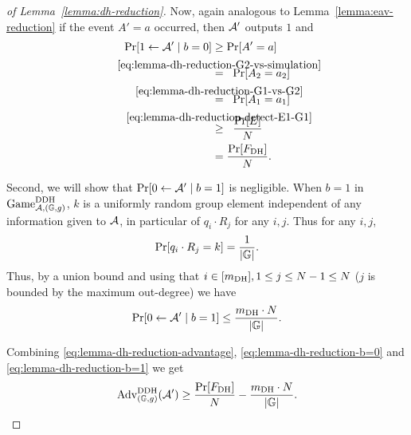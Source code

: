 \begin{proof}[of Lemma~\ref{lemma:dh-reduction}]
	Now, again analogous to Lemma~\ref{lemma:eav-reduction} if the event $A' = a$ occurred, then $\mathcal{A}'$ outputs $1$ and
	\begin{align*}
		\pr{1 \from \adv' \mid b = 0} & \ge \pr{A' = a}                                                             \\
		                            & \stackrel{\mathclap{\eqref{eq:lemma-dh-reduction-G2-vs-simulation}}}{=} \;\; \pr{A_2 = a_2} \\
		                            & \stackrel{\mathclap{\eqref{eq:lemma-dh-reduction-G1-vs-G2}}}{=} \;\; \pr{A_1 = a_1}        \\
		                            & \stackrel{\mathclap{\eqref{eq:lemma-dh-reduction-detect-E1-G1}}}{\ge} \;\; \frac{\pr{E}}{N} \\
		                            & = \frac{\pr{\fdh}}{N}.
	\end{align*}

	Second, we will show that $\pr{0 \from \adv' \mid b = 1}$ is negligible. When $b = 1$ in $\mathrm{Game}_{\mathcal{A}, (\mathbb{G}, g)}^{\mathrm{DDH}}$, $k$ is a uniformly random group element independent of any information given to $\mathcal{A}$, in particular of $q_i \cdot R_j$ for any $i, j$. Thus for any $i, j$,
	\[
		\pr{q_i \cdot R_j = k} = \frac{1}{\abs{\mathbb{G}}}.
	\]
	Thus, by a union bound and using that $i \in [m_\mathrm{DH}], 1 \le j \le N - 1 \le N$ ($j$ is bounded by the maximum out-degree) we have
	\begin{equation} \label{eq:lemma-dh-reduction-b=1}
		\pr{0 \from \adv' \mid b = 1} \le \frac{\mdh \cdot N}{\abs{\mathbb{G}}}.
	\end{equation}

	Combining \eqref{eq:lemma-dh-reduction-advantage}, \eqref{eq:lemma-dh-reduction-b=0} and \eqref{eq:lemma-dh-reduction-b=1} we get
	\begin{align} \label{eq:lemma-dh-reduction-advantage-lower-bound}
		\begin{split}
			\mathrm{Adv}_{(\mathbb{G}, g)}^{\mathrm{DDH}}(\adv') \ge \frac{\pr{\fdh}}{N} - \frac{\mdh \cdot N}{\abs{\mathbb{G}}}.
		\end{split}
	\end{align}


\end{proof}
